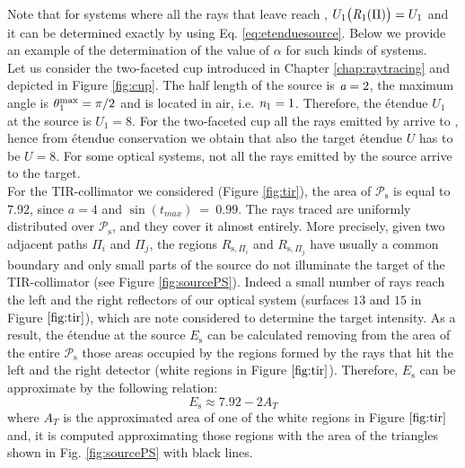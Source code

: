 Note that for systems where all the rays that leave  reach , $U_1\big(\mbox{$\emph{R}_{\textit{$1$}}$}(\Pi)\big) = U_1$ and it can be determined exactly by using Eq. \ref{eq:etenduesource}. Below we provide an example of the determination of the value of $\alpha$ for such kinds of systems.
\\ \indent Let us consider the two-faceted cup introduced in Chapter \ref{chap:raytracing} and depicted in Figure \ref{fig:cup}. The half length of the source is $\textit{a}=2$, the maximum angle is $\theta_1^{\textrm{max}} = \pi/2$ and  is located in air, i.e. $\textit{n}_1=1$. Therefore, the \'{e}tendue $U_1 $ at the source is $U_1=8$. For the two-faceted cup all the rays emitted by  arrive to , hence from \'{e}tendue conservation we obtain that also the target \'{e}tendue $U$ has to be $U = 8$.
For some optical systems, not all the rays emitted by the source arrive to the target.  
\\
\indent
 For the TIR-collimator we considered (Figure \ref{fig:tir}), the area of $\mathcal{P}_\textrm{s}$ is equal to $7.92$, since $a = 4$ and $\sin(t_{max}) ~=~ 0.99$.
 The rays traced are uniformly distributed over $\mathcal{P}_\textrm{s}$, and they cover it almost entirely.
 More precisely, given two adjacent paths $\Pi_i$ and $\Pi_j$, the regions $R_{\textrm{s}, \Pi_i}$ and $R_{\textrm{s}, \Pi_j}$ have usually a common boundary and only small parts of the source do not illuminate the target of the TIR-collimator (see Figure \ref{fig:sourcePS}).
 Indeed a small number of rays reach the left and the right reflectors of our optical system (surfaces $13$ and $15$ in Figure $\ref{fig:tir}$), which are note considered to determine the target intensity.
 As a result, the \'{e}tendue at the source $E_{\textrm{s}}$ can be calculated removing from the area of the entire $\mathcal{P}_\textrm{s}$ those areas occupied by the regions formed by the rays that hit the left and the right detector (white regions in Figure $\ref{fig:tir}$).  Therefore, $E_{\textrm{s}}$ can be approximate by the following relation:
 \begin{equation}
 E_{\textrm{s}}\approx 7.92-2A_{T}
 \end{equation}
 where $A_{T}$ is the approximated area of one of the white regions in Figure $\ref{fig:tir}$ and, it is computed approximating those regions with the area of the triangles shown in Fig. \ref{fig:sourcePS} with black lines.
